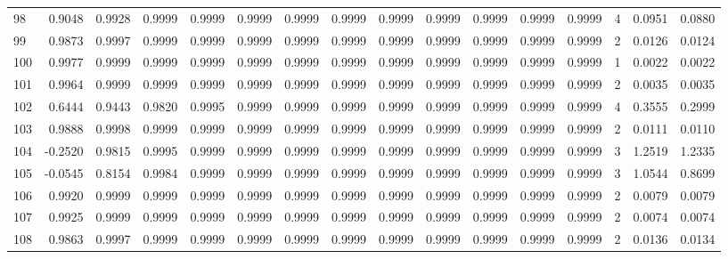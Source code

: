 \begin{tabular}{lrrrrrrrrrrrrrrr}
98  &      0.9048 &  0.9928 &  0.9999 &  0.9999 &  0.9999 &  0.9999 &  0.9999 &  0.9999 &  0.9999 &  0.9999 &   0.9999 &     0.9999 &      4 &                    0.0951 &                     0.0880 \\
99  &      0.9873 &  0.9997 &  0.9999 &  0.9999 &  0.9999 &  0.9999 &  0.9999 &  0.9999 &  0.9999 &  0.9999 &   0.9999 &     0.9999 &      2 &                    0.0126 &                     0.0124 \\
100 &      0.9977 &  0.9999 &  0.9999 &  0.9999 &  0.9999 &  0.9999 &  0.9999 &  0.9999 &  0.9999 &  0.9999 &   0.9999 &     0.9999 &      1 &                    0.0022 &                     0.0022 \\
101 &      0.9964 &  0.9999 &  0.9999 &  0.9999 &  0.9999 &  0.9999 &  0.9999 &  0.9999 &  0.9999 &  0.9999 &   0.9999 &     0.9999 &      2 &                    0.0035 &                     0.0035 \\
102 &      0.6444 &  0.9443 &  0.9820 &  0.9995 &  0.9999 &  0.9999 &  0.9999 &  0.9999 &  0.9999 &  0.9999 &   0.9999 &     0.9999 &      4 &                    0.3555 &                     0.2999 \\
103 &      0.9888 &  0.9998 &  0.9999 &  0.9999 &  0.9999 &  0.9999 &  0.9999 &  0.9999 &  0.9999 &  0.9999 &   0.9999 &     0.9999 &      2 &                    0.0111 &                     0.0110 \\
104 &     -0.2520 &  0.9815 &  0.9995 &  0.9999 &  0.9999 &  0.9999 &  0.9999 &  0.9999 &  0.9999 &  0.9999 &   0.9999 &     0.9999 &      3 &                    1.2519 &                     1.2335 \\
105 &     -0.0545 &  0.8154 &  0.9984 &  0.9999 &  0.9999 &  0.9999 &  0.9999 &  0.9999 &  0.9999 &  0.9999 &   0.9999 &     0.9999 &      3 &                    1.0544 &                     0.8699 \\
106 &      0.9920 &  0.9999 &  0.9999 &  0.9999 &  0.9999 &  0.9999 &  0.9999 &  0.9999 &  0.9999 &  0.9999 &   0.9999 &     0.9999 &      2 &                    0.0079 &                     0.0079 \\
107 &      0.9925 &  0.9999 &  0.9999 &  0.9999 &  0.9999 &  0.9999 &  0.9999 &  0.9999 &  0.9999 &  0.9999 &   0.9999 &     0.9999 &      2 &                    0.0074 &                     0.0074 \\
108 &      0.9863 &  0.9997 &  0.9999 &  0.9999 &  0.9999 &  0.9999 &  0.9999 &  0.9999 &  0.9999 &  0.9999 &   0.9999 &     0.9999 &      2 &                    0.0136 &                     0.0134 \\

\end{tabular}
